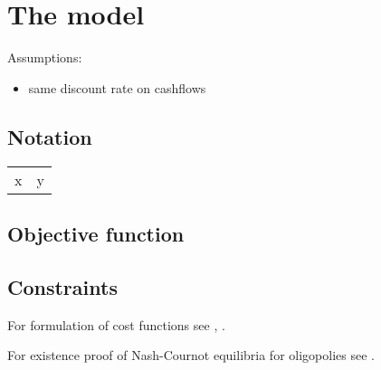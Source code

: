 \section{The model}

Assumptions:

\begin{itemize}
	\item same discount rate on cashflows
\end{itemize}

\subsection{Notation}

\begin{longtable}[l]{l l}
x & y\\
\end{longtable}

\subsection{Objective function}

\subsection{Constraints}

For formulation of cost functions see \cite{Bergman1995}, \cite{Pineau2003}.	

For existence proof of Nash-Cournot equilibria for oligopolies see \cite{Murphy1982}.



